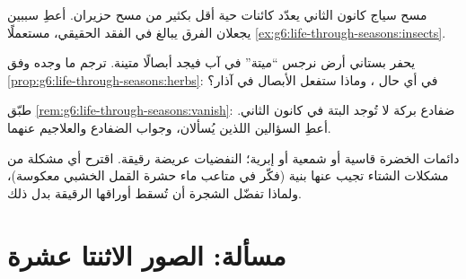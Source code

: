 \begin{exercise}[$\star\star$]\label{exo:g6:life-through-seasons:9}
مسح سياج كانون الثاني يعدّد كائنات حية أقل بكثير من مسح حزيران.
أعطِ سببين يجعلان الفرق يبالغ في الفقد الحقيقي، مستعملًا
\cref{ex:g6:life-through-seasons:insects}.
\end{exercise}

\begin{exercise}[$\star\star$]\label{exo:g6:life-through-seasons:10}
يحفر بستاني أرض نرجس ``ميتة'' في آب فيجد أبصالًا متينة. ترجم ما
وجده وفق \cref{prop:g6:life-through-seasons:herbs}: في أي حال
، وماذا ستفعل الأبصال في آذار؟
\end{exercise}

\begin{exercise}[$\star\star$]\label{exo:g6:life-through-seasons:11}
طبّق \cref{rem:g6:life-through-seasons:vanish}: ضفادع بركة لا
تُوجد البتة في كانون الثاني. أعطِ السؤالين اللذين يُسألان، وجواب
الضفادع والعلاجيم عنهما.
\end{exercise}

\begin{exercise}[$\star\star\star$]\label{exo:g6:life-through-seasons:12}
 دائمات الخضرة قاسية أو شمعية أو إبرية؛  النفضيات
عريضة رقيقة. اقترح أي مشكلة من مشكلات الشتاء تجيب عنها بنية 
 (فكّر في متاعب ماء حشرة القمل الخشبي معكوسة)، ولماذا
تفضّل الشجرة  أن تُسقط أوراقها الرقيقة بدل ذلك.
\end{exercise}

\section{مسألة: الصور الاثنتا عشرة}

